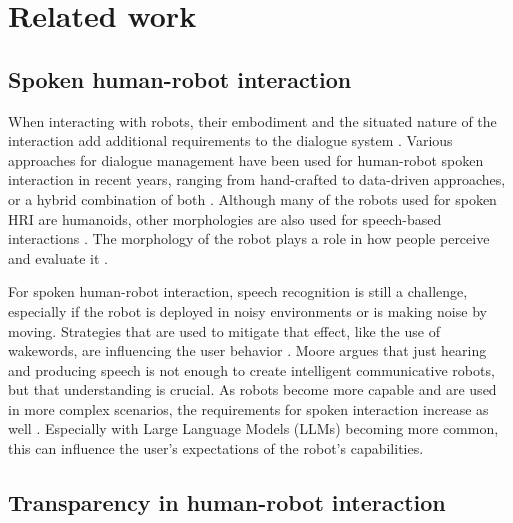 \section{Related work}
\subsection{Spoken human-robot interaction}

When interacting with robots, their embodiment and the situated nature of the interaction add additional requirements to the dialogue system \cite{jokinen2018dialogue}. Various approaches for dialogue management have been used for human-robot spoken interaction in recent years, ranging from hand-crafted to data-driven approaches, or a hybrid combination of both \cite{reimann2024survey}. Although many of the robots used for spoken HRI are humanoids, other morphologies are also used for speech-based interactions \cite{reimann2024survey}. %
The morphology of the robot plays a role in how people perceive and evaluate it \cite{kunold2023not}.

For spoken human-robot interaction, speech recognition is still a challenge, especially if the robot is deployed in noisy environments or is making noise by moving. Strategies that are used to mitigate that effect, like the use of wakewords, are influencing the user behavior \cite{wen2023fresh}.
Moore \cite{moore2015talking} argues that just hearing and producing speech is not enough to create intelligent communicative robots, but that understanding is crucial.
As robots become more capable and are used in more complex scenarios, the requirements for spoken interaction increase as well \cite{marge2022spoken}. Especially with Large Language Models (LLMs) becoming more common, this can influence the user's expectations of the robot's capabilities.


\subsection{Transparency in human-robot interaction}

